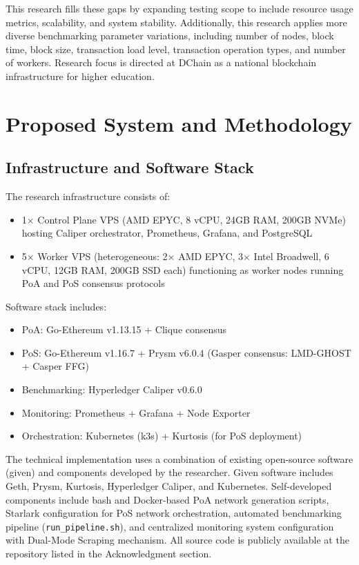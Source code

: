 \documentclass[conference]{IEEEtran}
\begin{document}
This research fills these gaps by expanding testing scope to include resource usage metrics, scalability, and system stability. Additionally, this research applies more diverse benchmarking parameter variations, including number of nodes, block time, block size, transaction load level, transaction operation types, and number of workers. Research focus is directed at DChain as a national blockchain infrastructure for higher education.

\section{Proposed System and Methodology}

\subsection{Infrastructure and Software Stack}

The research infrastructure consists of:
\begin{itemize}
    \item 1× Control Plane VPS (AMD EPYC, 8 vCPU, 24GB RAM, 200GB NVMe) hosting Caliper orchestrator, Prometheus, Grafana, and PostgreSQL
    \item 5× Worker VPS (heterogeneous: 2× AMD EPYC, 3× Intel Broadwell, 6 vCPU, 12GB RAM, 200GB SSD each) functioning as worker nodes running PoA and PoS consensus protocols
\end{itemize}

Software stack includes:
\begin{itemize}
    \item PoA: Go-Ethereum v1.13.15 + Clique consensus
    \item PoS: Go-Ethereum v1.16.7 + Prysm v6.0.4 (Gasper consensus: LMD-GHOST + Casper FFG)
    \item Benchmarking: Hyperledger Caliper v0.6.0
    \item Monitoring: Prometheus + Grafana + Node Exporter
    \item Orchestration: Kubernetes (k3s) + Kurtosis (for PoS deployment)
\end{itemize}

The technical implementation uses a combination of existing open-source software (given) and components developed by the researcher. Given software includes Geth, Prysm, Kurtosis, Hyperledger Caliper, and Kubernetes. Self-developed components include bash and Docker-based PoA network generation scripts, Starlark configuration for PoS network orchestration, automated benchmarking pipeline (\texttt{run\_pipeline.sh}), and centralized monitoring system configuration with Dual-Mode Scraping mechanism. All source code is publicly available at the repository listed in the Acknowledgment section.
\end{document}
